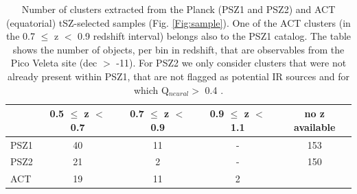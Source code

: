 \documentclass[11pt,a4paper,twoside,graphicx,color]{article}
\begin{document}
\begin{table}
\centering
\begin{tabular}{|l  || c | c | c || c |}           
 \hline    
  &  0.5 $\leq$ z $<$ 0.7  & 0.7 $\leq$ z $<$ 0.9 & 0.9 $\leq$ z $<$ 1.1 & no z available\\ \hline
  PSZ1 & 40 & 11 & - & 153 \\  \hline 
  PSZ2 & 21 & 2 & - & 150 \\  \hline
  ACT & 19 & 11 & 2 & \\  \hline
\end{tabular}
 \caption{{\small Number of clusters extracted from the Planck (PSZ1 and PSZ2) and ACT (equatorial) tSZ-selected samples (Fig. \ref{Fig:sample}). One of the ACT clusters (in the 0.7 $\leq$ z $<$ 0.9 redshift interval) belongs also to the PSZ1 catalog. The table shows the number of objects, per bin in redshift, that are observables from the Pico Veleta site (dec $>$ -11). For PSZ2 we only consider clusters that were not already present within PSZ1, that are not flagged as potential IR sources and for which Q$_{neural} >$ 0.4 \citep{PSZ2, Aghanim2014}.}}
 \label{tab:availables}
\end{table} 
\end{document}
